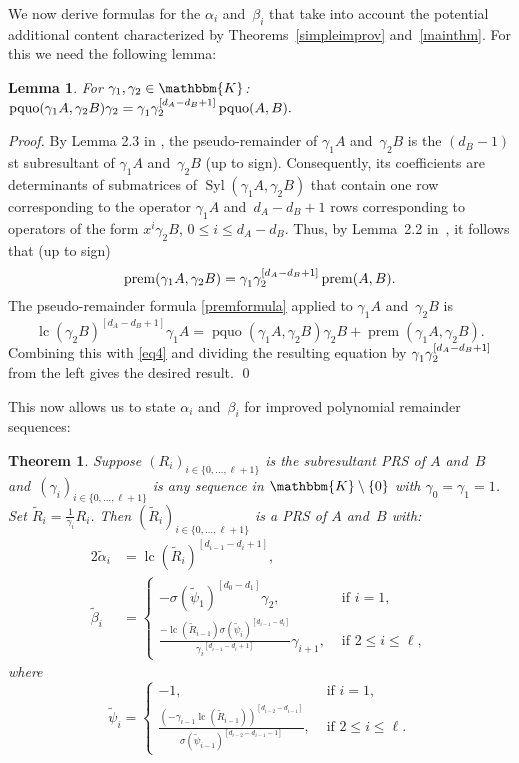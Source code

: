 \documentclass[3p,11pt,preprint]{elsarticle}
\newtheorem{theorem}{Theorem}
\newtheorem{lemma}{Lemma}
\let\set\mathbbm
\newcommand{\qk}{\set{K}}
\newcommand{\D}{x}
\newcommand{\lc}{\operatorname{lc}}
\newcommand{\syl}{\operatorname{Syl}}
\newcommand{\pquo}{\operatorname{pquo}}
\newcommand{\prem}{\operatorname{prem}}
\newcommand{\prs}[3]{(#1_i)_{i\in \{#2,\dots,#3\}}}
\begin{document}
We now derive formulas for the $\alpha_i$ and~$\beta_i$ that take into account the potential additional content characterized by Theorems~\ref{simpleimprov} and~\ref{mainthm}. For this we need the following lemma:

\begin{lemma}
\label{quothm}
 For $\gamma_1,\gamma_2\in\qk$:
 $\pquo(\gamma_1A,\gamma_2B)\gamma_2 = \gamma^{\mathstrut}_1\gamma_2^{[d_A-d_B+1]}\pquo(A,B).$
\end{lemma}
\begin{proof}
 By Lemma 2.3 in \cite{zli}, the pseudo-remainder of $\gamma_1A$ and~$\gamma_2B$ is the $(d_B-1)$st subresultant of $\gamma_1A$ and~$\gamma_2B$ (up to sign). Consequently, its coefficients are determinants of submatrices of $\syl(\gamma_1A,\gamma_2B)$ that contain one row corresponding to the operator $\gamma_1A$ and~$d_A-d_B+1$ rows corresponding to operators of the form $\D^i\gamma_2B$, $0\leq i\leq d_A-d_B$. Thus, by Lemma~2.2 in~\cite{zli}, it follows that (up to sign)
\begin{equation}
\label{eq4}
\prem(\gamma_1A,\gamma_2B) = \gamma^{\mathstrut}_1\gamma_2^{[d_A-d_B+1]}\prem(A,B).
\end{equation} 
The pseudo-remainder formula \eqref{premformula} applied to  $\gamma_1 A$ and~$\gamma_2 B$ is\[\lc(\gamma_2B)^{[d_A-d_B+1]}\gamma_1A=\pquo(\gamma_1A,\gamma_2B)\gamma_2B + \prem(\gamma_1A,\gamma_2B).\]
Combining this with \eqref{eq4} and dividing the resulting equation by $ \gamma^{\mathstrut}_1\gamma_2^{[d_A-d_B+1]}$ from the left gives the desired result. \qed
\end{proof}

This now allows us to state $\alpha_i$ and~$\beta_i$ for improved polynomial remainder sequences:

\begin{theorem}
\label{newabs}
 Suppose $\prs{R}{0}{\ell+1}$ is the subresultant PRS of $A$ and~$B$ and~$\prs{\gamma}{0}{\ell+1}$ is any sequence in $\qk\setminus\{0\}$ with $\gamma_0=\gamma_1=1$. Set $\tilde{R}_i = \frac{1}{\gamma_i}R_i$. Then $\prs{\tilde{R}}{0}{\ell+1}$ is a PRS of $A$ and~$B$ with: 
\begin{alignat*}2
 \tilde{\alpha}_i & = \lc(\tilde{R}_i)^{[d_{i-1}-d_i+1]},\\
 \tilde{\beta}_i & = \left\{\begin{array}{ll}
\displaystyle -\sigma(\tilde{\psi}_1)^{[d_0 - d_1]}\gamma_2, & \text{ if } i=1,\\
\displaystyle \frac{-\lc(\tilde{R}_{i-1})\sigma(\tilde{\psi}_i)^{[d_{i-1}-d_i]}}{{\gamma_i}^{[d_{i-1}-d_i+1]}}\gamma_{i+1}, & \text{ if } 2\leq i\leq\ell,\end{array}\right.
\end{alignat*}
where
\[
\tilde{\psi}_i = \left\{\begin{array}{ll}
                 \displaystyle -1, & \text{ if } i = 1,\\
                 \displaystyle \frac{(-\gamma_{i-1}\lc(\tilde{R}_{i-1}))^{[d_{i-2}-d_{i-1}]}}{\sigma(\tilde{\psi}_{i-1})^{[d_{i-2}-d_{i-1}-1]}}, & \text{ if } 2\leq i\leq\ell.
                \end{array}\right.
\]
\end{theorem}
\end{document}
